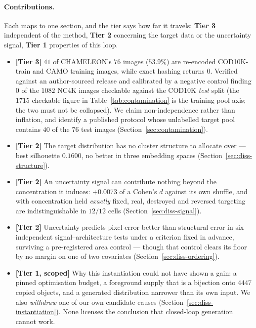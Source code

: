 \documentclass{article} %
\begin{document}
\paragraph{Contributions.} Each maps to one section, and the tier says how far it travels:
\textbf{Tier 3} independent of the method, \textbf{Tier 2} concerning the target data or the
uncertainty signal, \textbf{Tier 1} properties of this loop.

\begin{itemize}
\itemsep0.10em
\item \textbf{[Tier 3]} $41$ of CHAMELEON's $76$ images ($53.9\%$) are re-encoded COD10K-train and
CAMO training images, while exact hashing returns $0$. Verified against an author-sourced release and
calibrated by a negative control finding $0$ of the $1082$ NC4K images checkable against the COD10K
\emph{test} split (the $1715$ checkable figure in Table~\ref{tab:contamination} is the training-pool
axis; the two must not be collapsed). We claim non-independence rather than inflation, and identify a
published protocol whose unlabelled target pool contains $40$ of the $76$ test images
(Section~\ref{sec:contamination}).
\item \textbf{[Tier 2]} The target distribution has no cluster structure to allocate over --- best
silhouette $0.1600$, no better in three embedding spaces (Section~\ref{sec:diss-structure}).
\item \textbf{[Tier 2]} An uncertainty signal can contribute nothing beyond the concentration it
induces: $+0.0073$ of a Cohen's $d$ against its own shuffle, and with concentration held \emph{exactly}
fixed, real, destroyed and reversed targeting are indistinguishable in $12/12$ cells
(Section~\ref{sec:diss-signal}).
\item \textbf{[Tier 2]} Uncertainty predicts pixel error better than structural error in six
independent signal--architecture tests under a criterion fixed in advance, surviving a pre-registered
area control --- though that control clears its floor by no margin on one of two covariates
(Section~\ref{sec:diss-ordering}).
\item \textbf{[Tier 1, scoped]} Why this instantiation could not have shown a gain: a pinned
optimisation budget, a foreground supply that is a bijection onto $4447$ copied objects, and a
generated distribution narrower than its own input. We also \emph{withdraw} one of our own candidate
causes (Section~\ref{sec:diss-instantiation}). None licenses the conclusion that closed-loop
generation cannot work.
\end{itemize}
\end{document}
